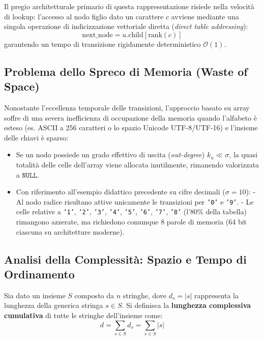 Il pregio architetturale primario di questa rappresentazione risiede nella velocit\`a di lookup: l'accesso al nodo figlio dato un carattere $c$ avviene mediante una singola operazione di indicizzazione vettoriale diretta (\textit{direct table addressing}):
\begin{equation}
  \text{next\_node} = u.\text{child}[\text{rank}(c)]
\end{equation}
garantendo un tempo di transizione rigidamente deterministico $\mathcal{O}(1)$.

\FloatBarrier
\subsection{Problema dello Spreco di Memoria (Waste of Space)}
\label{subsec:spreco-memoria-array-based}

Nonostante l'eccellenza temporale delle transizioni, l'approccio basato su array soffre di una severa inefficienza di occupazione della memoria quando l'alfabeto \`e esteso (es. ASCII a 256 caratteri o lo spazio Unicode UTF-8/UTF-16) e l'insieme delle chiavi \`e sparso:
\begin{itemize}
  \item Se un nodo possiede un grado effettivo di uscita (\textit{out-degree}) $k_u \ll \sigma$, la quasi totalit\`a delle celle dell'array viene allocata inutilmente, rimanendo valorizzata a $\texttt{NULL}$.
  \item Con riferimento all'esempio didattico precedente su cifre decimali ($\sigma = 10$):
    - Al nodo radice risultano attive unicamente le transizioni per \texttt{'0'} e \texttt{'9'}.
    - Le celle relative a \texttt{'1'}, \texttt{'2'}, \texttt{'3'}, \texttt{'4'}, \texttt{'5'}, \texttt{'6'}, \texttt{'7'}, \texttt{'8'} (l'80\% della tabella) rimangono azzerate, ma richiedono comunque 8 parole di memoria (64 bit ciascuna su architetture moderne).
\end{itemize}

\FloatBarrier
\subsection{Analisi della Complessità: Spazio e Tempo di Ordinamento}
\label{subsec:complessita-array-based}

Sia dato un insieme $S$ composto da $n$ stringhe, dove $d_s = |s|$ rappresenta la lunghezza della generica stringa $s \in S$. Si definisca la \textbf{lunghezza complessiva cumulativa} di tutte le stringhe dell'insieme come:
\begin{equation}
  d = \sum_{s \in S} d_s = \sum_{s \in S} |s|
\end{equation}

